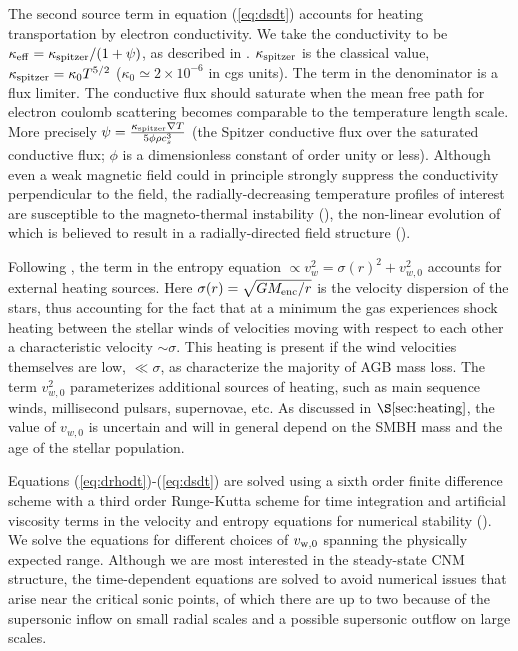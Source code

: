 \documentclass[usenatbib,fleqn]{mn2e}
\newcommand{\vw}{v_w}
\begin{document}
The second source term in equation (\ref{eq:dsdt}) accounts for
heating transportation by electron conductivity. We take the
conductivity to be $\kappa_{\rm eff}=\kappa_{\rm spitzer}/(1+\psi)$,
as described in \citealt{DaltonBalbus:1993a}. $\kappa_{\rm spitzer}$
is the classical \citealt{Spitzer62} value, $\kappa_{\rm spitzer} =
\kappa_0 T^{5/2}$ ($\kappa_0\simeq 2\times 10^{-6}$ in cgs units). The
term in the denominator is a flux limiter. The conductive flux should
saturate when the mean free path for electron coulomb scattering
becomes comparable to the temperature length scale.  More precisely
$\psi=\frac{\kappa_{\rm spitzer} \nabla T}{5\phi \rho c_s^3}$ (the
Spitzer conductive flux over the saturated conductive flux; $\phi$ is
a dimensionless constant of order unity or less). Although even a weak
magnetic field could in principle strongly suppress the conductivity
perpendicular to the field, the radially-decreasing temperature
profiles of interest are susceptible to the magneto-thermal
instability (\citealt{Balbus01}), the non-linear evolution of which is
believed to result in a radially-directed field structure
(\citealt{Parrish&Stone07}).

Following \citet{ShcherbakovWong+:2014a}, the term in the entropy
equation $\propto \vw^2 = \sigma(r)^2+v_{w,0}^2$ accounts for external
heating sources.  Here $\sigma(r) = \sqrt{GM_{\rm enc}/r}$ is the
velocity dispersion of the stars, thus accounting for the fact that at
a minimum the gas experiences shock heating between the stellar winds
of velocities moving with respect to each other a characteristic
velocity $\sim \sigma$.  This heating is present if the wind velocities themselves
are low, $\ll \sigma$, as characterize the majority of AGB mass loss.
The term $v_{w,0}^{2}$ parameterizes additional sources of heating,
such as main sequence winds, millisecond pulsars, supernovae, etc.  As
discussed in $\S\ref{sec:heating}$, the value of $v_{w,0}$ is
uncertain and will in general depend on the SMBH mass and the age of
the stellar population.

Equations (\ref{eq:drhodt})-(\ref{eq:dsdt}) are solved using a sixth
order finite difference scheme with a third order Runge-Kutta scheme
for time integration and artificial viscosity terms in the velocity
and entropy equations for numerical stability (\citealt{Brandenburg:2003a}).  We solve the equations for
different choices of $v_{\rm w,0}$ spanning the physically expected
range.  Although we are most interested in the steady-state CNM
structure, the time-dependent equations are solved to avoid numerical
issues that arise near the critical sonic points, of which there are
up to two because of the supersonic inflow on small radial scales and
a possible supersonic outflow on large scales.
\end{document}
